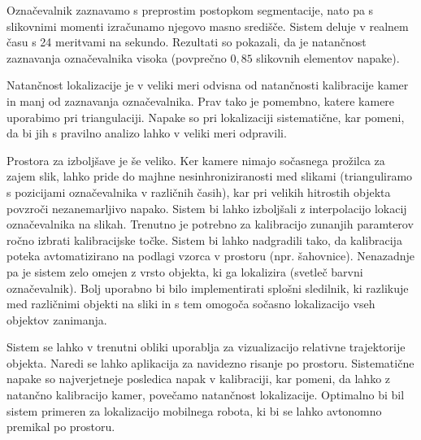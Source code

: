 \documentclass[a4paper, 12pt]{book}
\begin{document}
Označevalnik zaznavamo s preprostim postopkom segmentacije, nato pa s slikovnimi momenti izračunamo njegovo masno središče. Sistem deluje v realnem času s 24 meritvami na sekundo. Rezultati so pokazali, da je natančnost zaznavanja označevalnika visoka (povprečno $0,85$ slikovnih elementov napake).

Natančnost lokalizacije je v veliki meri odvisna od natančnosti kalibracije kamer in manj od zaznavanja označevalnika. Prav tako je pomembno, katere kamere uporabimo pri triangulaciji. Napake so pri lokalizaciji sistematične, kar pomeni, da bi jih s pravilno analizo lahko v veliki meri odpravili.

Prostora za izboljšave je še veliko. Ker kamere nimajo sočasnega prožilca za zajem slik, lahko pride do majhne nesinhroniziranosti med slikami (trianguliramo s pozicijami označevalnika v različnih časih), kar pri velikih hitrostih objekta povzroči nezanemarljivo napako. Sistem bi lahko izboljšali z interpolacijo lokacij označevalnika na slikah. Trenutno je potrebno za kalibracijo zunanjih paramterov ročno izbrati kalibracijske točke. Sistem bi lahko nadgradili tako, da kalibracija poteka avtomatizirano na podlagi vzorca v prostoru (npr. šahovnice). Nenazadnje pa je sistem zelo omejen z vrsto objekta, ki ga lokalizira (svetleč barvni označevalnik). Bolj uporabno bi bilo implementirati splošni sledilnik, ki razlikuje med različnimi objekti na sliki in s tem omogoča sočasno lokalizacijo vseh objektov zanimanja.

Sistem se lahko v trenutni obliki uporablja za vizualizacijo relativne trajektorije objekta. Naredi se lahko aplikacija za navidezno risanje po prostoru. Sistematične napake so najverjetneje posledica napak v kalibraciji, kar pomeni, da lahko z natančno kalibracijo kamer, povečamo natančnost lokalizacije. Optimalno bi bil sistem primeren za lokalizacijo mobilnega robota, ki bi se lahko avtonomno premikal po prostoru.

{}

\end{document}
